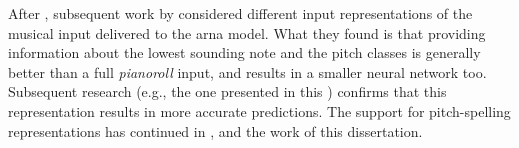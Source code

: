
After \textcite{chen2018functional}, subsequent work by
\textcite{micchi2020not} considered different input
representations of the musical input delivered to the
\gls{arna} model. What they found is that providing
information about the lowest sounding note and the pitch
classes is generally better than a full \emph{pianoroll}
input, and results in a smaller neural network too.
Subsequent research (e.g., the one presented in this
\thesisdiss{}) confirms that this representation results in
more accurate predictions. The support for pitch-spelling
representations has continued in
\textcite{mcleod2021modular}, and the work of this
dissertation.
